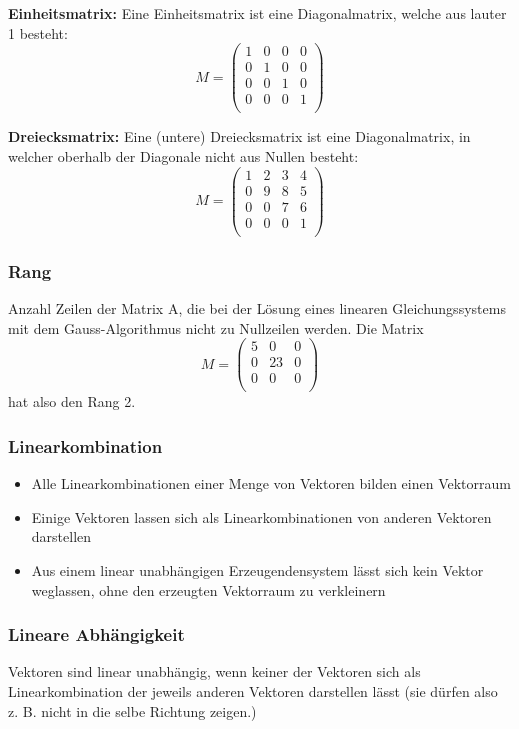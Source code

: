 \textbf{Einheitsmatrix:} Eine Einheitsmatrix ist eine Diagonalmatrix,
welche aus lauter 1 besteht:
\[ M = \begin {pmatrix}
 1  & 0  & 0  & 0 \\
 0  & 1  & 0  & 0 \\
 0  & 0  & 1  & 0 \\
 0  & 0  & 0  & 1 \\
\end {pmatrix} \]

\textbf{Dreiecksmatrix:} Eine (untere) Dreiecksmatrix ist eine Diagonalmatrix,
in welcher oberhalb der Diagonale nicht aus Nullen besteht:
\[ M = \begin {pmatrix}
 1  & 2  & 3  & 4 \\
 0  & 9  & 8  & 5 \\
 0  & 0  & 7  & 6 \\
 0  & 0  & 0  & 1 \\
\end {pmatrix} \]

\subsubsection{Rang}
Anzahl Zeilen der Matrix A, die bei der Lösung eines linearen
Gleichungssystems mit dem Gauss-Algorithmus nicht zu Nullzeilen werden.
Die Matrix
\[ M = \begin {pmatrix}
 5  & 0  & 0 \\
 0  & 23  & 0 \\
 0  & 0  & 0 \\
\end {pmatrix} \]
hat also den Rang 2.

\subsubsection{Linearkombination}
\begin{itemize}
  \item Alle Linearkombinationen einer Menge von Vektoren bilden einen
  Vektorraum
  \item Einige Vektoren lassen sich als Linearkombinationen von anderen
  Vektoren darstellen
  \item Aus einem linear unabhängigen Erzeugendensystem lässt sich kein Vektor
    weglassen, ohne den erzeugten Vektorraum zu verkleinern
\end{itemize}

\subsubsection{Lineare Abhängigkeit}
Vektoren sind linear unabhängig, wenn keiner der Vektoren sich
als Linearkombination der jeweils anderen Vektoren darstellen lässt
(sie dürfen also z. B. nicht in die selbe Richtung zeigen.)

